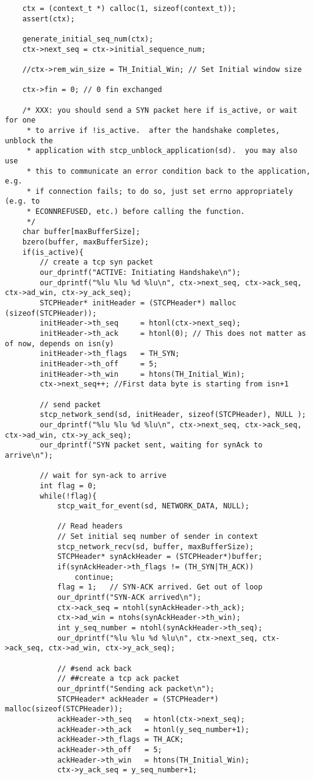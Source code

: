 \documentclass[11pt,a4paper,titlepage]{article}
\begin{document}
\begin{lstlisting}
    ctx = (context_t *) calloc(1, sizeof(context_t));
    assert(ctx);

    generate_initial_seq_num(ctx);
	ctx->next_seq = ctx->initial_sequence_num;

	//ctx->rem_win_size = TH_Initial_Win; // Set Initial window size

	ctx->fin = 0; // 0 fin exchanged

    /* XXX: you should send a SYN packet here if is_active, or wait for one
     * to arrive if !is_active.  after the handshake completes, unblock the
     * application with stcp_unblock_application(sd).  you may also use
     * this to communicate an error condition back to the application, e.g.
     * if connection fails; to do so, just set errno appropriately (e.g. to
     * ECONNREFUSED, etc.) before calling the function.
     */
	char buffer[maxBufferSize];
	bzero(buffer, maxBufferSize);
	if(is_active){
		// create a tcp syn packet
		our_dprintf("ACTIVE: Initiating Handshake\n");
		our_dprintf("%lu %lu %d %lu\n", ctx->next_seq, ctx->ack_seq, ctx->ad_win, ctx->y_ack_seq);
		STCPHeader* initHeader = (STCPHeader*) malloc (sizeof(STCPHeader));
		initHeader->th_seq	   = htonl(ctx->next_seq);
		initHeader->th_ack	   = htonl(0); // This does not matter as of now, depends on isn(y)
		initHeader->th_flags   = TH_SYN;
		initHeader->th_off     = 5;
		initHeader->th_win     = htons(TH_Initial_Win);
		ctx->next_seq++; //First data byte is starting from isn+1

		// send packet 
		stcp_network_send(sd, initHeader, sizeof(STCPHeader), NULL );
		our_dprintf("%lu %lu %d %lu\n", ctx->next_seq, ctx->ack_seq, ctx->ad_win, ctx->y_ack_seq);
		our_dprintf("SYN packet sent, waiting for synAck to arrive\n");
		
		// wait for syn-ack to arrive
		int flag = 0;
		while(!flag){
			stcp_wait_for_event(sd, NETWORK_DATA, NULL);

			// Read headers
			// Set initial seq number of sender in context
			stcp_network_recv(sd, buffer, maxBufferSize);
			STCPHeader* synAckHeader = (STCPHeader*)buffer;
			if(synAckHeader->th_flags != (TH_SYN|TH_ACK))
				continue;
			flag = 1;	// SYN-ACK arrived. Get out of loop
			our_dprintf("SYN-ACK arrived\n");
			ctx->ack_seq = ntohl(synAckHeader->th_ack);
			ctx->ad_win = ntohs(synAckHeader->th_win);
			int y_seq_number = ntohl(synAckHeader->th_seq);
			our_dprintf("%lu %lu %d %lu\n", ctx->next_seq, ctx->ack_seq, ctx->ad_win, ctx->y_ack_seq);
			
			// #send ack back 
			// ##create a tcp ack packet
			our_dprintf("Sending ack packet\n");
			STCPHeader* ackHeader = (STCPHeader*) malloc(sizeof(STCPHeader));
			ackHeader->th_seq	= htonl(ctx->next_seq);
			ackHeader->th_ack	= htonl(y_seq_number+1);
			ackHeader->th_flags = TH_ACK;
			ackHeader->th_off   = 5;
			ackHeader->th_win   = htons(TH_Initial_Win);
			ctx->y_ack_seq = y_seq_number+1;


\end{lstlisting}
\end{document}
